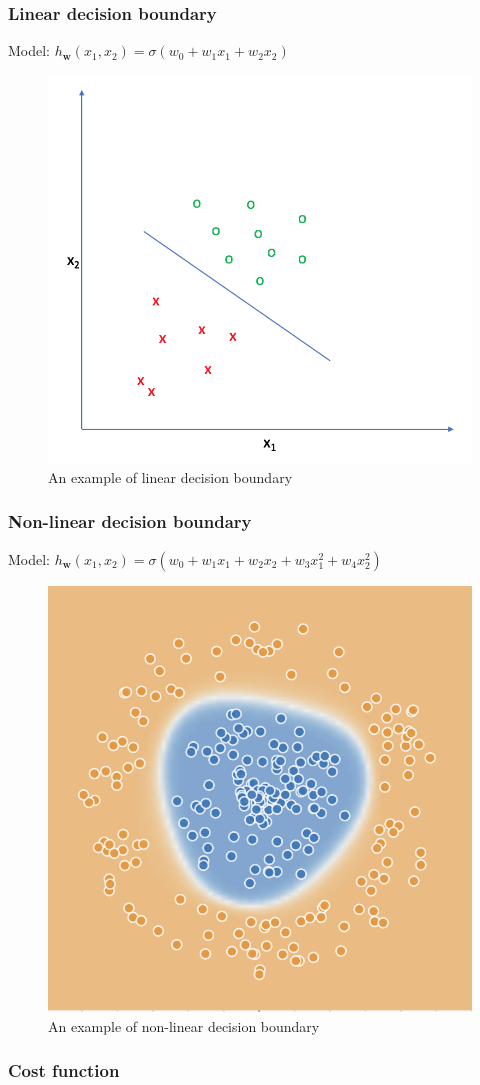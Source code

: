 \documentclass{beamer}
\begin{document}
	\begin{frame}
		\frametitle{Linear decision boundary}
		Model: $h_{\bm{w}}(x_1, x_2) = \sigma(w_0 + w_1 x_1 + w_2 x_2)$
		\begin{figure}
			\centering
			\includegraphics[scale=0.5]{images/decision_boundary}
			\caption{An example of linear decision boundary}
		\end{figure}
	\end{frame}

	\begin{frame}
		\frametitle{Non-linear decision boundary}
		Model: $h_{\bm{w}}(x_1, x_2) = \sigma(w_0 + w_1 x_1 + w_2 x_2 + w_3 x_1^2 + w_4 x_2^2)$
		\begin{figure}
			\centering
			\includegraphics[scale=0.8]{images/non-linear-decision-boundary}
			\caption{An example of non-linear decision boundary}
		\end{figure}
	\end{frame}

	\begin{frame}
		\frametitle{Cost function}
	\end{frame}
\end{document}
